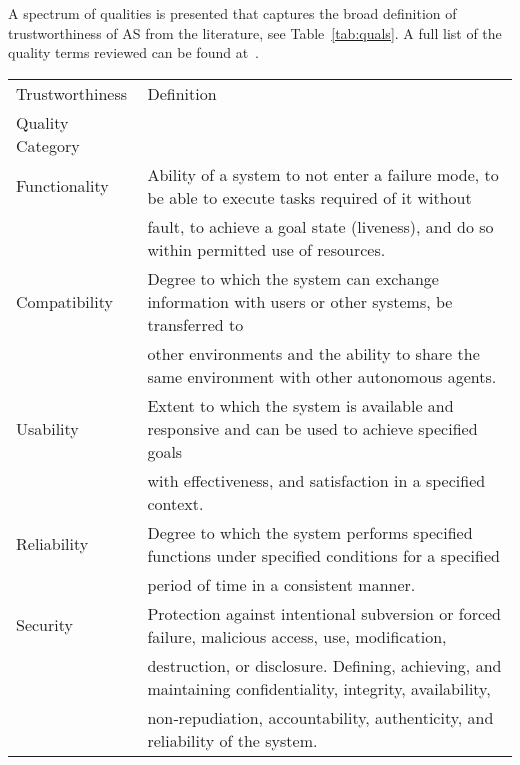 





A spectrum of qualities is presented that captures the broad definition of trustworthiness of AS from the literature, see Table~\ref{tab:quals}. A full list of the quality terms reviewed can be found at~\cite{tsl_git}.

\begin{table*}[t]
\caption{Trustworthiness qualities ontology}\label{tab:quals}
\centering
\begin{tabular}{ll}
\toprule
Trustworthiness  & Definition                \\ 
Quality Category   &   \\ \midrule

Functionality & Ability of a system to not enter a failure mode, to be able to execute tasks required of it without \\
&fault, to achieve a goal state (liveness), and do so within permitted use of resources.\\

Compatibility & Degree to which the system can exchange information with users or other systems, be transferred to\\
&other environments and the ability to share the same environment with other autonomous agents.\\

Usability & Extent to which the system is available and responsive and can be used to achieve specified goals\\
&with effectiveness, and satisfaction in a specified context.\\

Reliability & Degree to which the system performs specified functions under specified conditions for a specified\\
&period of time in a consistent manner.\\

Security & Protection against intentional subversion or forced failure, malicious access, use, modification, \\
&destruction, or disclosure. Defining, achieving, and maintaining confidentiality, integrity, availability, \\
&non‐repudiation, accountability, authenticity, and reliability of the system. \\


\end{tabular}
\end{table*}
